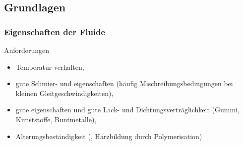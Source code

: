 \subsection{Grundlagen}
\begin{frame}
  \frametitle{Eigenschaften der Fluide}
  Anforderungen
  \begin{itemize}
    \item Temperatur-verhalten,
    \item gute Schmier- und eigenschaften 
      (h\"aufig Mischreibungsbedingungen bei kleinen Gleitgeschwindigkeiten),
    \item gute eigenschaften und gute 
      Lack- und Dichtungsvertr\"aglichkeit (Gummi, Kunststoffe, Buntmetalle),
    \item Alterungsbest\"andigkeit (, Harzbildung durch Polymerisation)
  \end{itemize}
  
   \ifteacher%
   \else%
     \vspace*{-1.0\baselineskip}\rotatebox[origin=lB]{180}{%
     \resizebox{0.9\linewidth}{!}{\parbox[t]{3.95\linewidth}{%
     Viskosit\"ats, Verschlei\ss{}schutz, Korrosionsschutz, Oxidation
     }}}
   \fi%
  

\end{frame}

